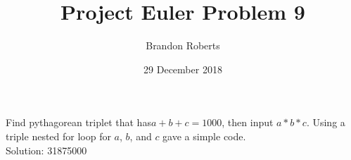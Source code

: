 \documentclass{article}
\begin{document}
\title{Project Euler Problem 9}
\author{Brandon Roberts}
\date{29 December 2018}

\maketitle

Find pythagorean triplet that has$ a + b + c = 1000$, then input $a*b*c$.
Using a triple nested for loop for $a$, $b$, and $c$ gave a simple code.\\
Solution: 31875000
\end{document}
